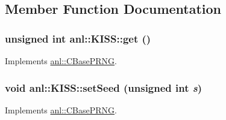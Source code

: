 \subsection{Member Function Documentation}
\hypertarget{classanl_1_1KISS_a1025043c844dd93d33bedf412fef9cc3}{
\subsubsection[{get}]{\setlength{\rightskip}{0pt plus 5cm}unsigned int anl::KISS::get ()}}
\label{classanl_1_1KISS_a1025043c844dd93d33bedf412fef9cc3}


Implements \hyperlink{classanl_1_1CBasePRNG_a7a0fcd0d3c4b0f9f160835b4b254a1ed}{anl::CBasePRNG}.\hypertarget{classanl_1_1KISS_a975aa76ee0371fc8da9afae199192e04}{
\subsubsection[{setSeed}]{\setlength{\rightskip}{0pt plus 5cm}void anl::KISS::setSeed (unsigned int {\em s})}}
\label{classanl_1_1KISS_a975aa76ee0371fc8da9afae199192e04}


Implements \hyperlink{classanl_1_1CBasePRNG_a6e9a81522fe055749739e4d79b5aa27e}{anl::CBasePRNG}.

